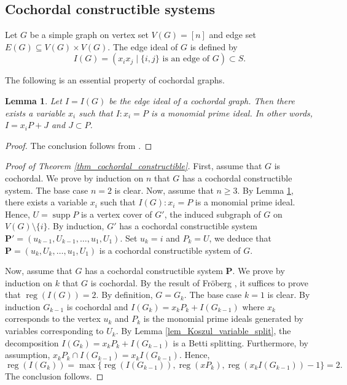 \documentclass[12pt,amscd]{amsart}
\newtheorem{lem}[thm]{Lemma}
\theoremstyle{definition}
\numberwithin{equation}{section}
\DeclareMathOperator{\supp}{supp}
\DeclareMathOperator{\reg}{reg}
\def\P {\mathbf P}
\begin{document}
\subsection{Cochordal constructible systems} Let $G$ be a simple graph on vertex set $V(G) = [n]$ and edge set $E(G) \subseteq V(G) \times V(G)$. The edge ideal of $G$ is defined by 
$$I(G) = (x_ix_j \mid \{i,j\} \text{ is an edge of } G) \subset S.$$


The following is an essential property of cochordal graphs. 
\begin{lem}\label{lem_cochordal_cover_ideal} Let $I = I(G)$ be the  edge ideal of a cochordal graph. Then there exists a variable $x_i$ such that $I:x_i = P$ is a monomial prime ideal. In other words, $I = x_i P + J$ and $J \subset P$.  
\end{lem}
\begin{proof}
    The conclusion follows from \cite[Proposition 3.19]{JV}.
\end{proof}

\begin{proof}[Proof of Theorem \ref{thm_cochordal_constructible}] First, assume that $G$ is cochordal. We prove by induction on $n$ that $G$ has a cochordal constructible system. The base case $n = 2$ is clear. Now, assume that $n \ge 3$. By Lemma \ref{lem_cochordal_cover_ideal}, there exists a variable $x_i$ such that $I(G):x_i = P$ is a monomial prime ideal. Hence, $U = \supp P$ is a vertex cover of $G'$, the induced subgraph of $G$ on $V(G) \setminus \{i\}$. By induction, $G'$ has a cochordal constructible system $\P' = (u_{k-1},U_{k-1}, \ldots, u_1, U_1)$. Set $u_k = i$ and $P_k = U$, we deduce that $\P = (u_k,U_k, \ldots, u_1, U_1)$ is a cochordal constructible system of $G$.


Now, assume that $G$ has a cochordal constructible system $\P$. We prove by induction on $k$ that $G$ is cochordal. By the result of Fr\"oberg \cite{F}, it suffices to prove that $\reg (I(G)) = 2$. By definition, $G = G_k$. The base case $k = 1$ is clear. By induction $G_{k-1}$ is cochordal and $I(G_k) = x_k P_k + I(G_{k-1})$ where $x_k$ corresponds to the vertex $u_k$ and $P_k$ is the monomial prime ideals generated by variables corresponding to $U_k$. By Lemma \ref{lem_Koszul_variable_split}, the decomposition $I(G_k) = x_k P_k + I(G_{k-1})$ is a Betti splitting. Furthermore, by assumption, $x_kP_k \cap I(G_{k-1}) = x_k I(G_{k-1})$. Hence, 
$$\reg (I(G_k))  = \max \{ \reg (I(G_{k-1})), \reg (x P_k), \reg (x_k I(G_{k-1})) - 1\} = 2.$$
The conclusion follows.
\end{proof}
\end{document}
